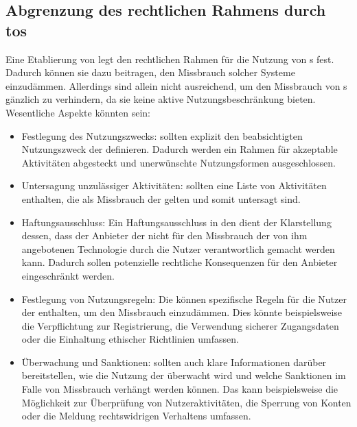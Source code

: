 \documentclass[hidelinks,12pt]{report}
\begin{document}
\subsection{Abgrenzung des rechtlichen Rahmens durch \Gls{tos}}
Eine Etablierung von  legt den rechtlichen Rahmen für die Nutzung von s fest. Dadurch können sie dazu beitragen, den Missbrauch solcher Systeme einzudämmen. Allerdings sind  allein nicht ausreichend, um den Missbrauch von s gänzlich zu verhindern, da sie keine aktive Nutzungsbeschränkung bieten. Wesentliche Aspekte könnten sein:\\

\begin{itemize}
    \item Festlegung des Nutzungszwecks:  sollten explizit den beabsichtigten Nutzungszweck der  definieren. Dadurch werden ein Rahmen für akzeptable Aktivitäten abgesteckt und unerwünschte Nutzungsformen ausgeschlossen.
    \item Untersagung unzulässiger Aktivitäten:  sollten eine Liste von Aktivitäten enthalten, die als Missbrauch der  gelten und somit untersagt sind.
    \item Haftungsausschluss: Ein Haftungsausschluss in den  dient der Klarstellung dessen, dass der Anbieter der  nicht für den Missbrauch der von ihm angebotenen Technologie durch die Nutzer verantwortlich gemacht werden kann. Dadurch sollen potenzielle rechtliche Konsequenzen für den Anbieter eingeschränkt werden.
    \item Festlegung von Nutzungsregeln: Die   können spezifische Regeln für die Nutzer der  enthalten, um den Missbrauch einzudämmen. Dies könnte beispielsweise die Verpflichtung zur Registrierung, die Verwendung sicherer Zugangsdaten oder die Einhaltung ethischer Richtlinien umfassen.
    \item Überwachung und Sanktionen:  sollten auch klare Informationen darüber bereitstellen, wie die Nutzung der  überwacht wird und welche Sanktionen im Falle von Missbrauch verhängt werden können. Das kann beispielsweise die Möglichkeit zur Überprüfung von Nutzeraktivitäten, die Sperrung von Konten oder die Meldung rechtswidrigen Verhaltens umfassen.
\end{itemize}

\newpage
\end{document}
